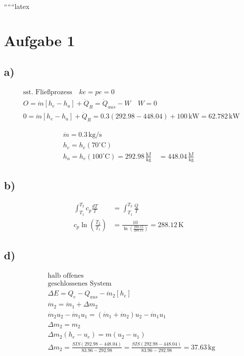 
``````latex


\section*{Aufgabe 1}

\subsection*{a)}

\begin{align*}
&\text{sst. Fließprozess} \quad ke = pe = 0 \\
&O = \dot{m} [h_e - h_a] + \dot{Q}_R = \dot{Q}_{aus} - W \quad W = 0 \\
&0 = \dot{m} [h_e - h_a] + \dot{Q}_R = 0.3 \left( 292.98 - 448.04 \right) + 100 \, \text{kW} = 62.782 \, \text{kW}
\end{align*}

\begin{align*}
\dot{m} = 0.3 \, \text{kg/s} \\
h_e = h_e (70^\circ \text{C}) \\
h_a = h_e (100^\circ \text{C}) = 292.98 \, \frac{\text{kJ}}{\text{kg}} \quad = 448.04 \, \frac{\text{kJ}}{\text{kg}}
\end{align*}

\subsection*{b)}

\begin{align*}
\int_{T_1}^{T_2} c_p \frac{dT}{T} &= \int_{T_1}^{T_2} \frac{Q}{T} \\
c_p \ln \left( \frac{T_2}{T_1} \right) &= \frac{10}{\ln \left( \frac{298.15}{288.15} \right)} = 288.12 \, \text{K}
\end{align*}

\subsection*{d)}

\begin{align*}
&\text{halb offenes} \\
&\text{geschlossenes System} \\
&\Delta E = Q_e - Q_{aus} - \dot{m}_2 [h_e] \\
&\dot{m}_2 = \dot{m}_1 + \Delta m_2 \\
&\dot{m}_2 u_2 - \dot{m}_1 u_1 = (\dot{m}_1 + \dot{m}_2) u_2 - \dot{m}_1 u_1 \\
&\Delta m_2 = m_2 \\
&\Delta m_2 (h_e - u_e) = m (u_2 - u_1) \\
&\Delta m_2 = \frac{SIS (292.98 - 448.04)}{83.96 - 292.98} = \frac{SIS (292.98 - 448.04)}{83.96 - 292.98} = 37.63 \, \text{kg}
\end{align*}

